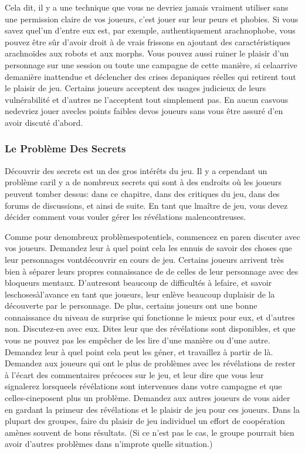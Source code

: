 {Cela dit, il y a une technique que vous ne devriez jamais vraiment utiliser sans une permission claire de vos joueurs, c'est jouer sur leur peurs et phobies. Si vous savez quel'un d'entre eux est, par exemple, authentiquement arachnophobe, vous pouvez être sûr d'avoir droit à de vrais frissons en ajoutant des caractéristiques arachnoïdes aux robots et aux morphs. Vous pouvez aussi ruiner le plaisir d'un personnage sur une session ou toute une campagne de cette manière, si celaarrive demanière inattendue et déclencher des crises depaniques réelles qui retirent tout le plaisir de jeu. Certains joueurs acceptent des usages judicieux de leurs vulnérabilité et d'autres ne l'acceptent tout simplement pas. En aucun casvous nedevriez jouer avecles points faibles devos joueurs sans vous être assuré d'en avoir discuté d'abord. 

\subsubsection{Le Problème Des Secrets} 

Découvrir des secrets est un des gros intérêts du jeu. Il y a cependant un problème caril y a de nombreux secrets qui sont à des endroits où les joueurs peuvent tomber dessus: dans ce chapitre, dans des critiques du jeu, dans des forums de discussions, et ainsi de suite. En tant que lmaître de jeu, vous devez décider comment vous vouler gérer les révélations malencontreuses. 

Comme pour denombreux problèmespotentiels, commencez en paren discuter avec vos joueurs. Demandez leur à quel point cela les ennuis de savoir des choses que leur personnages vontdécouvrir en cours de jeu. Certains joueurs arrivent très bien à séparer leurs propres connaissance de de celles de leur personnage avec des bloqueurs mentaux. D'autresont beaucoup de difficultés à lefaire, et savoir leschosesàl'avance en tant que joueurs, leur enlève beaucoup duplaisir de la découverte par le personnage. De plus, certains joueurs ont une bonne connaissance du niveau de surprise qui fonctionne le mieux pour eux, et d'autres non. Discutez-en avec eux. Dites leur que des révélations sont disponibles, et que vous ne pouvez pas les empêcher de les lire d'une manière ou d'une autre. Demandez leur à quel point cela peut les géner, et travaillez à partir de là. Demandez aux joueurs qui ont le plus de problèmes avec les révélations de rester à l'écart des commentaires précoces sur le jeu, et leur dire que vous leur signalerez lorsqueels révélations sont intervenues dans votre campagne et que celles-cineposent plus un problème. Demandez aux autres joueurs de vous aider en gardant la primeur des révélations et le plaisir de jeu pour ces joueurs. Dans la plupart des groupes, faire du plaisir de jeu individuel un effort de coopération amènes souvent de bons résultats. (Si ce n'est pas le cas, le groupe pourrait bien avoir d'autres problèmes dans n'improte quelle situation.) 

}
